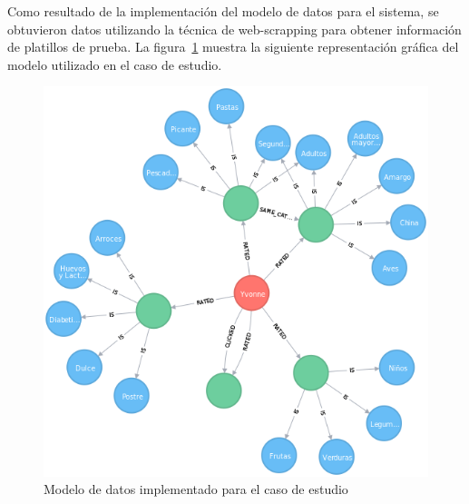 Como resultado de la implementación del modelo de datos para el sistema, se obtuvieron datos utilizando la técnica de web-scrapping para obtener información de platillos de prueba. La figura~\ref{fig:neo4j graph} muestra la siguiente representación gráfica del modelo utilizado en el caso de estudio. 
\begin{figure}[h!]
	\centering
	\includegraphics[width=12cm]{./images/graph}
	\caption{Modelo de datos implementado para el caso de estudio}
	\label{fig:neo4j graph}
\end{figure}
